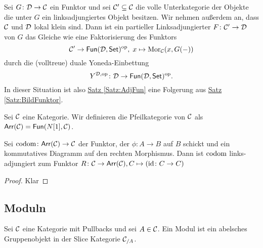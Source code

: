 \begin{Bem}
     Sei $G\colon \mathcal{D}\to \mathcal{C}$ ein Funktor und sei $\mathcal{C}'\subseteq \mathcal{C}$ die volle Unterkategorie der
 Objekte die unter $G$ ein linksadjungiertes Objekt besitzen. Wir nehmen außerdem an, dass $\mathcal{C}$
 und $\mathcal{D}$ lokal klein sind.
 Dann ist ein partieller Linksadjungierter $F\colon\mathcal{C}'\to \mathcal{D}$ von $G$ das Gleiche wie eine Faktorisierung des Funktors
 $$\mathcal{C}'\to\mathsf{Fun}(\mathcal{D},\mathsf{Set})^{\mathrm{op}},\; x\mapsto\operatorname{Mor}_{\mathcal{C}}(x,G(-))$$
 durch die (volltreue) duale Yoneda-Einbettung $$Y^{\mathcal{D},\mathrm{op}}\colon \mathcal{D}\to\mathsf{Fun}(\mathcal{D},\mathsf{Set})^{\mathrm{op}}.$$ In dieser Situation
 ist also \hyperref[Satz:AdjFun]{Satz \ref{Satz:AdjFun}} eine Folgerung aus \hyperref[Satz:BildFunktor]{Satz \ref{Satz:BildFunktor}}.
\end{Bem}
\begin{Def}\label{Def:ArrowCat}
    Sei $\mathcal{C}$ eine Kategorie. Wir definieren die Pfeilkategorie von $\mathcal{C}$ als $\mathsf{Arr}(\mathcal{C})=\mathsf{Fun}(N[1],\mathcal{C})$.
\end{Def}
\begin{Lemma}\label{Lem:CodomAdj}
    Sei $\operatorname{codom}\colon \mathsf{Arr}(\mathcal{C})\to \mathcal{C}$ der Funktor, der $\phi\colon A\to B$ auf $B$ schickt und ein kommutatives Diagramm auf den rechten Morphismus.
    Dann ist $\operatorname{codom}$ links-adjungiert zum Funktor $R\colon \mathcal{C}\to \mathsf{Arr}(\mathcal{C}), C\mapsto (\mathrm{id}\colon C\to C)$
\end{Lemma}
\begin{proof}
    Klar
\end{proof}
\subsection{Moduln}
\begin{Def}
    Sei $\mathcal{C}$ eine Kategorie mit Pullbacks und sei $A\in\mathcal{C}$. Ein Modul ist ein abelsches Gruppenobjekt in der Slice Kategorie $\mathcal{C}_{/A}$.
\end{Def}